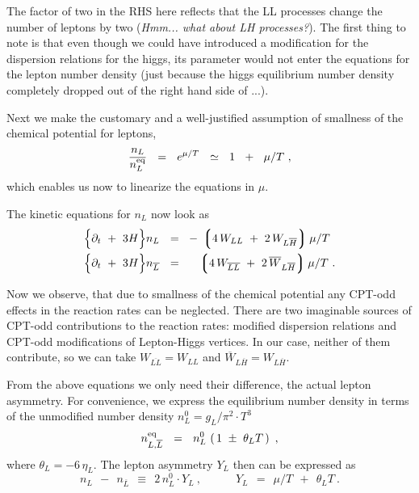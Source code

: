\documentclass[12pt]{revtex4}
\newcommand{\eq}{{\rm eq}}
\newcommand{\lgr}{\left\lgroup}
\newcommand{\rgr}{\right\rgroup}
\newcommand{\p}{\partial}
\newcommand{\ov}{\overline}
\begin{document}
	The factor of two in the RHS here reflects that the LL processes
	change the number of leptons by two ({\it Hmm... what about LH processes?}).
	The first thing to note is that even though we could have introduced
	a modification for the dispersion relations for the higgs, 
	its parameter would not enter the equations for the lepton number
	density (just because the higgs equilibrium number density completely
	dropped out of the right hand side of ...).
	
	Next we make the customary and a well-justified assumption of 
	smallness of the chemical potential for leptons,
\[
	\frac{n_L}{n_L^\eq} ~~=~~ e^{\mu/T} ~~\simeq~~ 1 ~~+~~ \mu/T~,
\]
	which enables us now to linearize the equations in $ \mu $.

	The kinetic equations for $ n_L $ now look as
\begin{equation}
\label{kinetic_eqn_prelim}
\begin{split}
	\Bigl\{ \p_t ~+~ 3H \Bigr\}
		n_L ~~=~~ & 
	-\, \lgr 4\, W_{LL} ~+~ 2\, W_{L\ov{H}} \rgr  \mu/T \\
	\Bigl\{ \p_t ~+~ 3H \Bigr\} 
		n_{\ov{L}} ~~=~~ &
	\phantom{-\,}
	\lgr 4\, W_{\ov{LL}} ~+~ 2\, \ov{W}_{L\ov{H}} \rgr  \mu/T ~.
\end{split}
\end{equation}

	Now we observe, that due to smallness of the chemical potential
	any CPT-odd effects in the reaction rates can be neglected.
	There are two imaginable sources of CPT-odd contributions 
	to the reaction rates: modified dispersion relations and 
	CPT-odd modifications of Lepton-Higgs vertices. 
	In our case, neither of them contribute, so we can take
	$ W_{\ov{LL}} = W_{LL} $ and
	$ \ov{W}_{L\ov{H}} = W_{L\ov{H}} $.

	From the above equations we only need their difference, the actual
	lepton asymmetry.
	For convenience, we express the equilibrium number density in terms
	of the unmodified number density 
	$ n_L^0 = g_L/\pi^2 \cdot T^3 $
\[
	n_{L,\ov{L}}^\eq ~~=~~ n_L^0\, \left(\, 1 ~\pm~ \theta_L T \,\right)~,
\]
	where $ \theta_L = -6\, \eta_L $.
	The lepton asymmetry $ Y_L $ then can be expressed as
\[
	n_L ~~-~~ n_{\ov{L}} ~~\equiv~~ 2\, n_L^0 \cdot Y_L~,
	\qquad\quad Y_L ~~=~~ \mu/T ~~+~~ \theta_L T~.
\]
	
\end{document}
